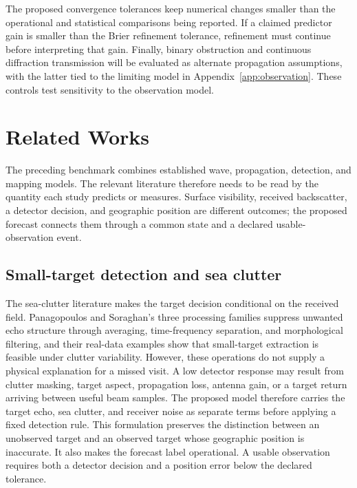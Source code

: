 \documentclass[10pt,letterpaper]{article}
\begin{document}
The proposed convergence tolerances keep numerical changes smaller than the operational and statistical comparisons being reported. If a claimed predictor gain is smaller than the Brier refinement tolerance, refinement must continue before interpreting that gain. Finally, binary obstruction and continuous diffraction transmission will be evaluated as alternate propagation assumptions, with the latter tied to the limiting model in Appendix~\ref{app:observation}. These controls test sensitivity to the observation model.

\clearpage

\section{Related Works}
\label{app:prior}

The preceding benchmark combines established wave, propagation, detection, and mapping models. The relevant literature therefore needs to be read by the quantity each study predicts or measures. Surface visibility, received backscatter, a detector decision, and geographic position are different outcomes; the proposed forecast connects them through a common state and a declared usable-observation event.

\subsection{Small-target detection and sea clutter}

The sea-clutter literature makes the target decision conditional on the received field. Panagopoulos and Soraghan's three processing families suppress unwanted echo structure through averaging, time-frequency separation, and morphological filtering, and their real-data examples show that small-target extraction is feasible under clutter variability. \cite{Panagopoulos2004SmallTarget} However, these operations do not supply a physical explanation for a missed visit. A low detector response may result from clutter masking, target aspect, propagation loss, antenna gain, or a target return arriving between useful beam samples. The proposed model therefore carries the target echo, sea clutter, and receiver noise as separate terms before applying a fixed detection rule. This formulation preserves the distinction between an unobserved target and an observed target whose geographic position is inaccurate. It also makes the forecast label operational. A usable observation requires both a detector decision and a position error below the declared tolerance.
\end{document}
